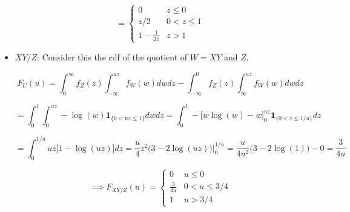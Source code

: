 \begin{solution}
\begin{itemize}
\[
=  \boxed{ \begin{cases} 
     0   & z \leq 0 \\
     z/2   & 0 < z \leq 1 \\
     1 - \frac{1}{2z} & z > 1
     \end{cases}}
\]

\item \(XY/Z\): Consider this the cdf of the quotient of \(W = XY\) and \(Z\).

\[
F_U(u)=\int_0^\infty f_Z(z) \int_{-\infty}^{uz} f_W(w) dw dz - \int_{-\infty}^0 f_Z(z) \int_{\infty}^ {uz} f_W(w) dw dz
\]

\[
=\int_0^1  \int_{0}^{uz} - \log(w)  \boldsymbol{1}_{\{0 < uz \leq 1\}} dw dz  =\int_0^1   - \big[ w \log(w) - w \big]_0^{uz} \boldsymbol{1}_{\{0 < z \leq 1/u\}}  dz  
\]

\[
=\int_0^{1/u} uz  \big[1  - \log(uz)  \big] dz = \frac{u}{4}z^2\big( 3 - 2 \log(uz) \big) \bigg|_0^{1/u}  = \frac{u}{4u^2}\big( 3 - 2 \log(1) \big) - 0 = \frac{3}{4u}
\]

\[
\implies \boxed{ F_{XY/Z}(u) =  \begin{cases} 
     0   & u \leq 0 \\
     \frac{3}{4u} & 0 < u \leq 3/4 \\
     1 & u > 3/4
     \end{cases}}
\]

\end{itemize}

\end{solution}


%
%
%
%
%
%
%
%
%
%
%
%



